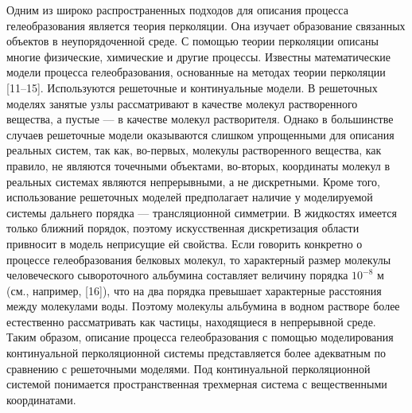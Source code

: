 Одним из широко распространенных подходов для описания процесса гелеобразования является теория перколяции. 
Она изучает образование связанных объектов в неупорядоченной среде. \cite{buzmakova} 
С помощью теории перколяции описаны многие физические, химические и другие процессы. 
Известны математические модели процесса гелеобразования, основанные на методах теории перколяции [11–15]. 
Используются решеточные и континуальные модели. 
В решеточных моделях занятые узлы рассматривают в качестве молекул растворенного вещества, а пустые — в качестве молекул растворителя.
Однако в большинстве случаев решеточные модели оказываются слишком упрощенными для описания реальных систем, так как, во-первых, молекулы растворенного вещества, как правило, не являются точечными объектами, во-вторых, координаты молекул в реальных системах являются непрерывными, а не дискретными.
Кроме того, использование решеточных моделей предполагает наличие у моделируемой системы дальнего порядка — трансляционной симметрии. 
В жидкостях имеется только ближний порядок, поэтому искусственная дискретизация области привносит в модель неприсущие ей свойства. 
Если говорить конкретно о процессе гелеобразования белковых молекул, то характерный размер молекулы человеческого сывороточного альбумина составляет величину порядка $10^{-8}$ м (см., например, [16]), что на два порядка превышает характерные расстояния между молекулами воды. 
Поэтому молекулы альбумина в водном растворе более естественно рассматривать как частицы, находящиеся в непрерывной среде. 
Таким образом, описание процесса гелеобразования с помощью моделирования континуальной перколяционной системы представляется более адекватным по сравнению с решеточными моделями. 
Под континуальной перколяционной системой понимается пространственная трехмерная система с вещественными координатами.